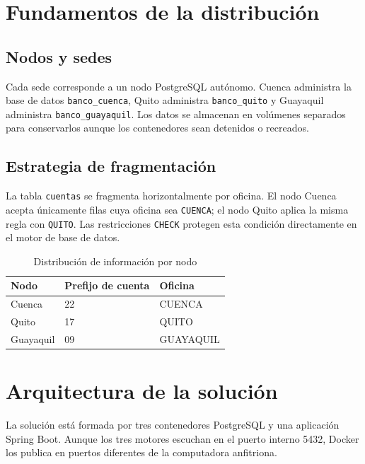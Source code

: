 \documentclass[12pt,a4paper]{article}
\begin{document}
\section{Fundamentos de la distribución}

\subsection{Nodos y sedes}

Cada sede corresponde a un nodo PostgreSQL autónomo. Cuenca administra la base de datos \texttt{banco\_cuenca}, Quito administra \texttt{banco\_quito} y Guayaquil administra \texttt{banco\_guayaquil}. Los datos se almacenan en volúmenes separados para conservarlos aunque los contenedores sean detenidos o recreados.

\subsection{Estrategia de fragmentación}

La tabla \texttt{cuentas} se fragmenta horizontalmente por oficina. El nodo Cuenca acepta únicamente filas cuya oficina sea \texttt{CUENCA}; el nodo Quito aplica la misma regla con \texttt{QUITO}. Las restricciones \texttt{CHECK} protegen esta condición directamente en el motor de base de datos.

\begin{table}[H]
  \centering
  \caption{Distribución de información por nodo}
  \begin{tabular}{lll}
    \toprule
    Nodo & Prefijo de cuenta & Oficina \\
    \midrule
    Cuenca & 22 & CUENCA \\
    Quito & 17 & QUITO \\
    Guayaquil & 09 & GUAYAQUIL \\
    \bottomrule
  \end{tabular}
\end{table}

\section{Arquitectura de la solución}

La solución está formada por tres contenedores PostgreSQL y una aplicación Spring Boot. Aunque los tres motores escuchan en el puerto interno 5432, Docker los publica en puertos diferentes de la computadora anfitriona.
\end{document}

